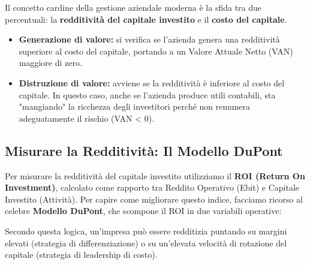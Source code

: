 \documentclass[a4paper,10pt]{article}
\begin{document}
Il concetto cardine della gestione aziendale moderna è la sfida tra due percentuali: la \textbf{redditività del capitale investito} e il \textbf{costo del capitale}.
\begin{itemize}
    \item \textbf{Generazione di valore:} si verifica se l'azienda genera una redditività superiore al costo del capitale, portando a un Valore Attuale Netto (VAN) maggiore di zero.
    \item \textbf{Distruzione di valore:} avviene se la redditività è inferiore al costo del capitale. In questo caso, anche se l'azienda produce utili contabili, sta "mangiando" la ricchezza degli investitori perché non remunera adeguatamente il rischio (VAN < 0).
\end{itemize}

\subsection*{Misurare la Redditività: Il Modello DuPont}

Per misurare la redditività del capitale investito utilizziamo il \textbf{ROI (Return On Investment)}, calcolato come rapporto tra Reddito Operativo (Ebit) e Capitale Investito (Attività). Per capire come migliorare questo indice, facciamo ricorso al celebre \textbf{Modello DuPont}, che scompone il ROI in due variabili operative:

\begin{table}[H]
\setlength{\extrarowheight}{10pt}
\caption{Scomposizione del ROI secondo il sistema DuPont}
\end{table}

Secondo questa logica, un'impresa può essere redditizia puntando su margini elevati (strategia di differenziazione) o su un'elevata velocità di rotazione del capitale (strategia di leadership di costo).
\end{document}
